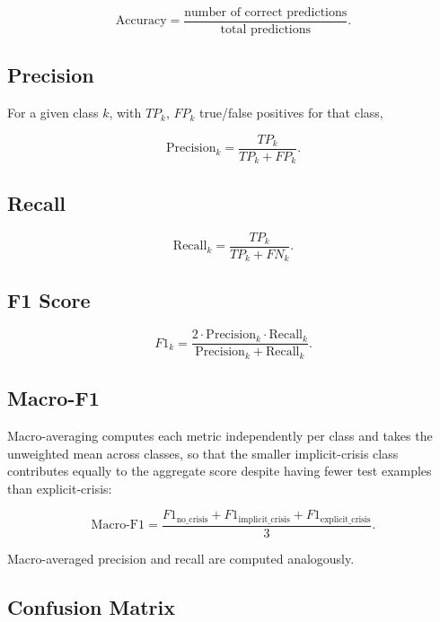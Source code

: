 \begin{equation}
\mathrm{Accuracy} = \frac{\text{number of correct predictions}}{\text{total predictions}}.
\end{equation}

\subsection{Precision}

For a given class $k$, with $TP_k$, $FP_k$ true/false positives for that class,

\begin{equation}
\mathrm{Precision}_k = \frac{TP_k}{TP_k + FP_k}.
\end{equation}

\subsection{Recall}

\begin{equation}
\mathrm{Recall}_k = \frac{TP_k}{TP_k + FN_k}.
\end{equation}

\subsection{F1 Score}

\begin{equation}
F1_k = \frac{2 \cdot \mathrm{Precision}_k \cdot \mathrm{Recall}_k}{\mathrm{Precision}_k + \mathrm{Recall}_k}.
\end{equation}

\subsection{Macro-F1}

Macro-averaging computes each metric independently per class and takes the unweighted mean across classes, so that the smaller implicit-crisis class contributes equally to the aggregate score despite having fewer test examples than explicit-crisis:

\begin{equation}
\mathrm{Macro\text{-}F1} = \frac{F1_{\text{no\_crisis}} + F1_{\text{implicit\_crisis}} + F1_{\text{explicit\_crisis}}}{3}.
\end{equation}

Macro-averaged precision and recall are computed analogously.

\subsection{Confusion Matrix}

